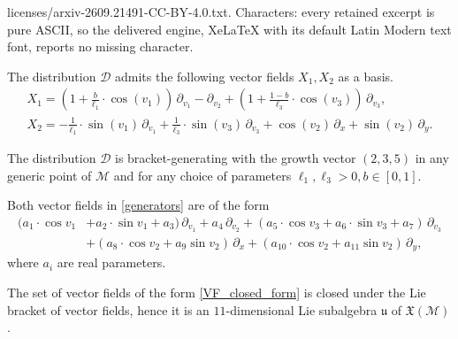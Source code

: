 \documentclass[10pt,a4paper]{amsart}
\newcommand{\mc}[1]{\mathcal{#1}}
\newcommand{\mfk}[1]{\mathfrak{#1}}
\begin{document}
licenses/arxiv-2609.21491-CC-BY-4.0.txt. Characters: every retained excerpt is pure ASCII, so the delivered engine, XeLaTeX with its default Latin Modern text font, reports no missing character.
\begin{proposition}
    The distribution $\mc{D}$ admits the following vector fields $X_1,X_2$ as a basis.
    \begin{equation}\label{generators}
    \begin{gathered}
        X_1 = \left( 1 + \frac{b}{\ell_1} \cdot \cos(v_1) \right)\, \partial_{v_1} - \partial_{v_2} + \left(1 + \frac{1-b}{\ell_3} \cdot \cos(v_3)\right)\, \partial_{v_3},\\
        X_2 = -\frac{1}{\ell_1} \cdot \sin(v_1)\, \partial_{v_1} + \frac{1}{\ell_3} \cdot \sin(v_3)\, \partial_{v_3} + \cos(v_2)\, \partial_{x} + \sin(v_2)\, \partial_{y}.
    \end{gathered}
    \end{equation}

    The distribution $\mc{D}$ is bracket-generating with the growth vector $(2,3,5)$ in any generic point of $\mc{M}$ and for any choice of parameters $\ell_1,\ell_3>0, b\in [0,1]$.
\end{proposition}

\begin{observation}
Both vector fields in \eqref{generators} are of the form
\begin{equation}\label{VF_closed_form}
\begin{aligned}
    (a_1 \cdot \cos v_1 &+ a_2 \cdot \sin v_1 + a_3) \,\partial_{v_1} + a_4 \,\partial_{v_2} + (a_5 \cdot \cos v_3 + a_6 \cdot \sin v_3 + a_7) \,\partial_{v_3}\\
    &+ (a_8 \cdot \cos v_2 + a_9 \sin v_2) \,\partial_x + (a_{10} \cdot \cos v_2 + a_{11} \sin v_2) \,\partial_y,
\end{aligned}
\end{equation}
where $a_i$ are real parameters.
\end{observation}

\begin{lemma} \label{lemma:Lie_bracket_closed}
    The set of vector fields of the form \eqref{VF_closed_form} is closed under the Lie bracket of vector fields, hence it is an $11$-dimensional Lie subalgebra $\mfk{u}$ of $\mfk{X}(\mc{M})$.
\end{lemma}
\end{document}
